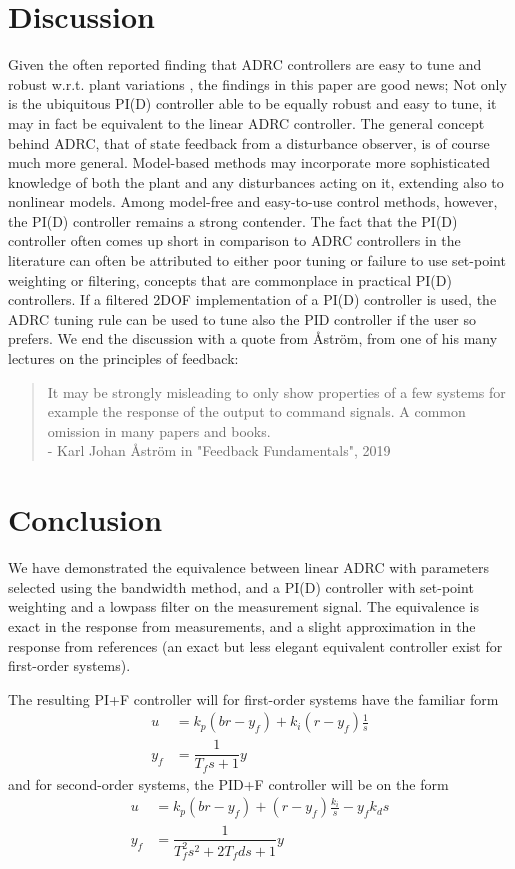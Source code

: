 \documentclass[letterpaper, 10 pt, conference]{ieeeconf}
\begin{document}
\section{Discussion}
Given the often reported finding that ADRC controllers are easy to tune and robust w.r.t. plant variations \cite{herbst2013simulative}, the findings in this paper are good news; Not only is the ubiquitous PI(D) controller able to be equally robust and easy to tune, it may in fact be equivalent to the linear ADRC controller. The general concept behind ADRC, that of state feedback from a disturbance observer, is of course much more general. Model-based methods may incorporate more sophisticated knowledge of both the plant and any disturbances acting on it, extending also to nonlinear models. Among model-free and easy-to-use control methods, however, the PI(D) controller remains a strong contender. The fact that the PI(D) controller often comes up short in comparison to ADRC controllers in the literature can often be attributed to either poor tuning or failure to use set-point weighting or filtering, concepts that are commonplace in practical PI(D) controllers. If a filtered 2DOF implementation of a PI(D) controller is used, the ADRC tuning rule can be used to tune also the PID controller if the user so prefers. We end the discussion with a quote from Åström, from one of his many lectures on the principles of feedback:

\begin{quotation}
	It may be strongly misleading to only show properties of a few systems for example the response of the output to command signals. A common omission in many papers and books.\\
	- Karl Johan Åström in "Feedback Fundamentals", 2019
\end{quotation}


\section{Conclusion}
We have demonstrated the equivalence between linear ADRC with parameters selected using the bandwidth method, and a PI(D) controller with set-point weighting and a lowpass filter on the measurement signal. The equivalence is exact in the response from measurements, and a slight approximation in the response from references (an exact but less elegant equivalent controller exist for first-order systems). 

The resulting PI+F controller will for first-order systems have the familiar form
\begin{align}
u &= k_p (br - y_f) + k_i(r-y_f)\frac{1}{s} \\
y_f &= \dfrac{1}{T_f s + 1} y
\end{align}
and for second-order systems, the PID+F controller will be on the form
\begin{align}
u &= k_p (br - y_f) + (r-y_f)\frac{k_i}{s} - y_fk_d s \\
y_f &= \dfrac{1}{T_f^2s^2 + 2T_f d s + 1} y
\end{align}
\end{document}
